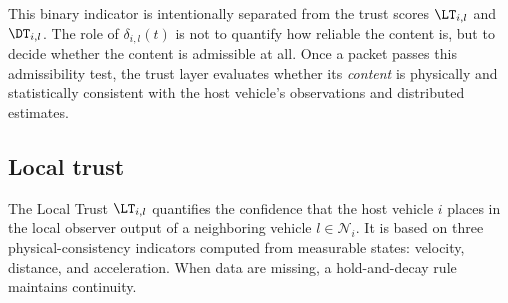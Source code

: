 This binary indicator is intentionally separated from the trust scores $\LT_{i,l}$ and $\DT_{i,l}$. The role of $\delta_{i,l}(t)$ is not to quantify how reliable the content is, but to decide whether the content is admissible at all. Once a packet passes this admissibility test, the trust layer evaluates whether its \emph{content} is physically and statistically consistent with the host vehicle's observations and distributed estimates.

\vspace*{-0.3cm}
\subsection{Local trust}\label{sub:local_trust}
\vspace*{-0.3cm}

The Local Trust $\LT_{i,l}$ quantifies the confidence that the host vehicle $i$ places in the local observer output of a neighboring vehicle $l \in \mathcal N_i$. 
It is based on three physical-consistency indicators computed from measurable states: velocity, distance, and acceleration. When data are missing, a hold-and-decay rule maintains continuity.




